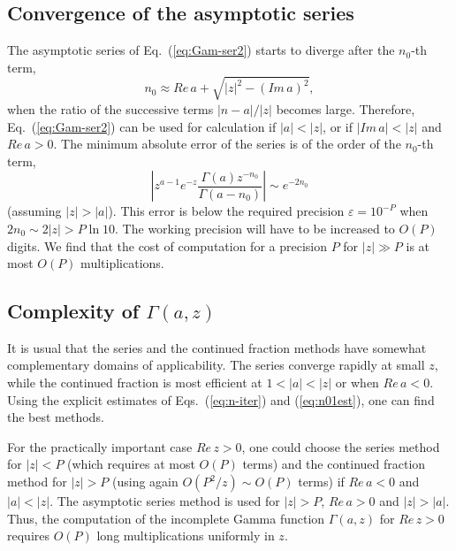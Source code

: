 \documentclass{llncs}
\begin{document}
\subsection{Convergence of the asymptotic series}

The asymptotic series of Eq.~(\ref{eq:Gam-ser2}) starts to diverge
after the $n_{0}$-th term,\begin{equation}
n_{0}\approx Re\, a+\sqrt{\left|z\right|^{2}-\left(Im\, a\right)^{2}},\end{equation}
 when the ratio of the successive terms $\left|n-a\right|/\left|z\right|$
becomes large. Therefore, Eq.~(\ref{eq:Gam-ser2}) can be used for
calculation if $\left|a\right|<\left|z\right|$, or if $\left|Im\, a\right|<\left|z\right|$
and $Re\, a>0$. The minimum absolute error of the series is of the
order of the $n_{0}$-th term,\begin{equation}
\left|z^{a-1}e^{-z}\frac{\Gamma \left(a\right)z^{-n_{0}}}{\Gamma \left(a-n_{0}\right)}\right|\sim e^{-2n_{0}}\end{equation}
(assuming $\left|z\right|>\left|a\right|$). This error is below the
required precision $\varepsilon =10^{-P}$ when $2n_{0}\sim 2\left|z\right|>P\ln 10$.
The working precision will have to be increased to $O\left(P\right)$
digits. We find that the cost of computation for a precision $P$
for $\left|z\right|\gg P$ is at most $O\left(P\right)$ multiplications.


\subsection{Complexity of $\Gamma \left(a,z\right)$}

It is usual that the series and the continued fraction methods have
somewhat complementary domains of applicability. The series converge
rapidly at small $z$, while the continued fraction is most efficient
at $1<\left|a\right|<\left|z\right|$ or when $Re\, a<0$. Using the
explicit estimates of Eqs.~(\ref{eq:n-iter}) and (\ref{eq:n01est}),
one can find the best methods. 

For the practically important case $Re\, z>0$, one could choose the
series method for $\left|z\right|<P$ (which requires at most $O\left(P\right)$
terms) and the continued fraction method for $\left|z\right|>P$ (using
again $O\left(P^{2}/z\right)\sim O\left(P\right)$ terms) if $Re\, a<0$
and $\left|a\right|<\left|z\right|$. The asymptotic series method
is used for $\left|z\right|>P$, $Re\, a>0$ and $\left|z\right|>\left|a\right|$.
Thus, the computation of the incomplete Gamma function $\Gamma \left(a,z\right)$
for $Re\, z>0$ requires $O\left(P\right)$ long multiplications uniformly
in $z$.
\end{document}
